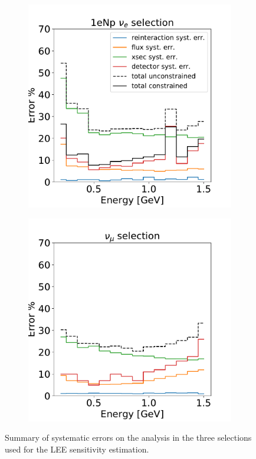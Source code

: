 \begin{figure}[H]
\begin{center}
\begin{subfigure}[b]{0.32\textwidth}
    \includegraphics[width=1.00\textwidth]{Systematics/1eNp_syst_summary.pdf}
    \caption{\label{fig:systsummary:zp}\zpsel}
    \end{subfigure}
    \begin{subfigure}[b]{0.32\textwidth}
    \centering
    \includegraphics[width=1.00\textwidth]{Systematics/numu_syst_summary.pdf}
    \caption{\label{fig:systsummary:numu}\numu}
    \end{subfigure}
\caption{\label{fig:systsummaryintro}Summary of systematic errors on the analysis in the three selections used for the LEE sensitivity estimation.}
\end{center}
\end{figure}


